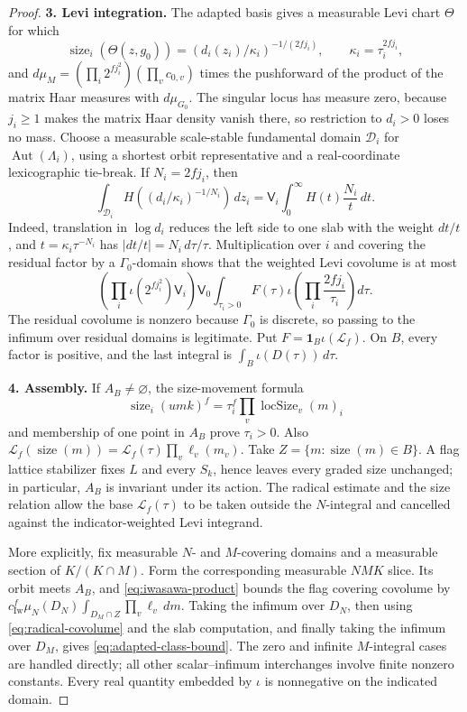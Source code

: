 \begin{proof}[Proof]
\textbf{3. Levi integration.} The adapted basis gives a measurable
Levi chart $\Theta$ for which
\[
 \operatorname{size}_i(\Theta(z,g_0))
 =(d_i(z_i)/\kappa_i)^{-1/(2fj_i)},\qquad
 \kappa_i=\tau_i^{2fj_i},
\]
and $d\mu_M=(\prod_i2^{fj_i^2})(\prod_vc_{0,v})$ times the pushforward
of the product of the matrix Haar measures with $d\mu_{G_0}$. The
singular locus has measure zero, because $j_i\ge1$ makes the matrix
Haar density vanish there, so restriction to $d_i>0$ loses no mass.
Choose a measurable scale-stable fundamental domain $\mathcal D_i$ for
$\operatorname{Aut}(\Lambda_i)$, using a shortest orbit representative
and a real-coordinate lexicographic tie-break. If $N_i=2fj_i$, then
\begin{equation}\label{eq:slab}
 \int_{\mathcal D_i}H((d_i/\kappa_i)^{-1/N_i})\,dz_i
 =\mathsf V_i\int_0^\infty H(t)\frac{N_i}{t}\,dt .
\end{equation}
Indeed, translation in $\log d_i$ reduces the left side to one slab
with the weight $dt/t$, and $t=\kappa_i\tau^{-N_i}$ has
$|dt/t|=N_i\,d\tau/\tau$. Multiplication over $i$ and covering the
residual factor by a $\Gamma_0$-domain shows that the weighted Levi
covolume is at most
\[
 \left(\prod_i\iota(2^{fj_i^2})\mathsf V_i\right)\mathsf V_0
 \int_{\tau_i>0}F(\tau)\iota\!\left(\prod_i\frac{2fj_i}{\tau_i}\right)
 d\tau .
\]
The residual covolume is nonzero because $\Gamma_0$ is discrete, so
passing to the infimum over residual domains is legitimate. Put
$F=\mathbf1_B\iota(\mathcal L_f)$. On $B$, every factor is positive,
and the last integral is $\int_B\iota(D(\tau))\,d\tau$.

\textbf{4. Assembly.} If $A_B\ne\varnothing$, the size-movement formula
\[
 \operatorname{size}_i(umk)^f
 =\tau_i^f\prod_v\operatorname{locSize}_v(m)_i
\]
and membership of one point in $A_B$ prove $\tau_i>0$. Also
$\mathcal L_f(\operatorname{size}(m))
 =\mathcal L_f(\tau)\prod_v\ell_v(m_v)$. Take
$Z=\{m:\operatorname{size}(m)\in B\}$. A flag lattice stabilizer
fixes $L$ and every $S_k$, hence leaves every graded size unchanged;
in particular, $A_B$ is invariant under its action. The radical estimate
and the size relation allow the base $\mathcal L_f(\tau)$ to be taken outside
the $N$-integral and cancelled against the indicator-weighted Levi
integrand.

More explicitly, fix measurable $N$- and $M$-covering domains and a
measurable section of $K/(K\cap M)$. Form the corresponding measurable
$NMK$ slice. Its orbit meets $A_B$, and \eqref{eq:iwasawa-product}
bounds the flag covering covolume by
$c_{\mathrm{Iw}}^f\mu_N(D_N)\int_{D_M\cap Z}\prod_v\ell_v\,dm$.
Taking the infimum over $D_N$, then using
\eqref{eq:radical-covolume} and the slab computation, and finally
taking the infimum over $D_M$, gives \eqref{eq:adapted-class-bound}.
The zero and infinite $M$-integral cases are handled directly; all
other scalar--infimum interchanges involve finite nonzero constants.
Every real quantity embedded by $\iota$ is nonnegative on the indicated
domain.
\end{proof}

